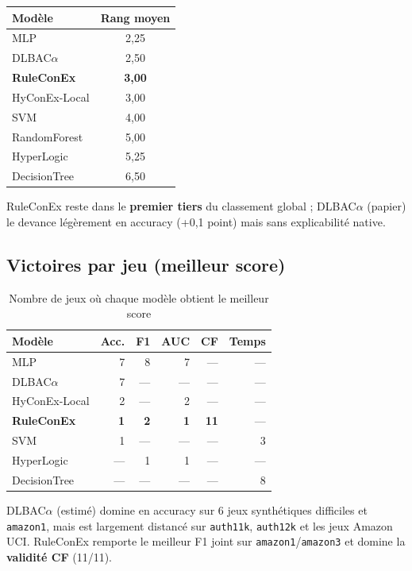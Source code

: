\documentclass[11pt,a4paper]{article}
\begin{document}
\begin{center}
\small
\begin{tabular}{@{}lc@{}}
\toprule
\textbf{Modèle} & \textbf{Rang moyen} \\
\midrule
MLP & 2,25 \\
DLBAC$\alpha$ & 2,50 \\
\textbf{RuleConEx} & \textbf{3,00} \\
HyConEx-Local & 3,00 \\
SVM & 4,00 \\
RandomForest & 5,00 \\
HyperLogic & 5,25 \\
DecisionTree & 6,50 \\
\bottomrule
\end{tabular}
\end{center}

RuleConEx reste dans le \textbf{premier tiers} du classement global ; DLBAC$\alpha$ (papier) le devance légèrement en accuracy (+0,1 point) mais sans explicabilité native.

\subsection{Victoires par jeu (meilleur score)}

\begin{table}[h]
\centering
\caption{Nombre de jeux où chaque modèle obtient le meilleur score}
\small
\begin{tabular}{@{}lrrrrr@{}}
\toprule
\textbf{Modèle} & \textbf{Acc.} & \textbf{F1} & \textbf{AUC} & \textbf{CF} & \textbf{Temps} \\
\midrule
MLP & 7 & 8 & 7 & --- & --- \\
DLBAC$\alpha$ & 7 & --- & --- & --- & --- \\
HyConEx-Local & 2 & --- & 2 & --- & --- \\
\textbf{RuleConEx} & \textbf{1} & \textbf{2} & \textbf{1} & \textbf{11} & --- \\
SVM & 1 & --- & --- & --- & 3 \\
HyperLogic & --- & 1 & 1 & --- & --- \\
DecisionTree & --- & --- & --- & --- & 8 \\
\bottomrule
\end{tabular}
\end{table}

DLBAC$\alpha$ (estimé) domine en accuracy sur 6 jeux synthétiques difficiles et \texttt{amazon1}, mais est largement distancé sur \texttt{auth11k}, \texttt{auth12k} et les jeux Amazon UCI. RuleConEx remporte le meilleur F1 joint sur \texttt{amazon1}/\texttt{amazon3} et domine la \textbf{validité CF} (11/11).
\end{document}
